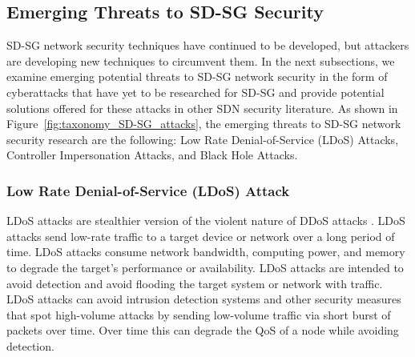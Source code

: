 \documentclass[conference]{IEEEtran}
\begin{document}

\subsection{Emerging Threats to SD-SG Security}
SD-SG network security techniques have continued to be developed, but attackers are developing new techniques to circumvent them. In the next subsections, we examine emerging potential threats to SD-SG network security in the form of cyberattacks that have yet to be researched for SD-SG and provide potential solutions offered for these attacks in other SDN security literature. As shown in Figure~\ref{fig:taxonomy_SD-SG_attacks}, the emerging threats to SD-SG network security research are the following: Low Rate Denial-of-Service (LDoS) Attacks, Controller Impersonation Attacks, and Black Hole Attacks. 

\subsubsection{Low Rate Denial-of-Service (LDoS) Attack}
    LDoS attacks are stealthier version of the violent nature of DDoS attacks \cite{zhijun2020low}. LDoS attacks send low-rate traffic to a target device or network over a long period of time. LDoS attacks consume network bandwidth, computing power, and memory to degrade the target's performance or availability. LDoS attacks are intended to avoid detection and avoid flooding the target system or network with traffic. LDoS attacks can avoid intrusion detection systems and other security measures that spot high-volume attacks by sending low-volume traffic via short burst of packets over time. Over time this can degrade the QoS of a node while avoiding detection. 
    
\end{document}
